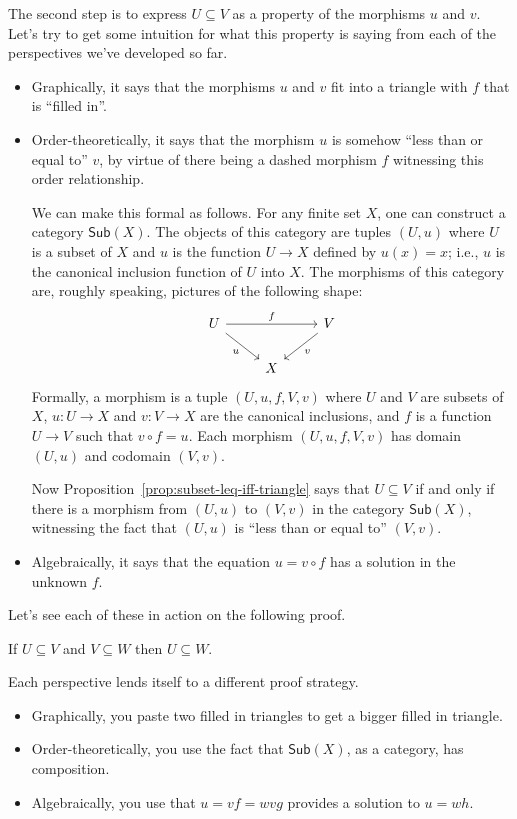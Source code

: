 The second step is to express \(U\subseteq V\)
as a property of the morphisms \(u\) and \(v\).
Let's try to get some intuition for what this property is saying
from each of the perspectives we've developed so far.
\begin{itemize}
\item Graphically, it says that the morphisms \(u\) and \(v\)
  fit into a triangle with \(f\) that is ``filled in''.
\item Order-theoretically, it says that the morphism \(u\) is somehow
  ``less than or equal to'' \(v\), by virtue of there being a dashed morphism
  \(f\) witnessing this order relationship.

  We can make this formal as follows.
  For any finite set \(X\), one can construct a category \(\mathsf{Sub}(X)\).
  The objects of this category are tuples \((U,u)\) where \(U\) is a subset of \(X\)
  and \(u\) is the function \(U \to X\) defined by \(u(x) = x\);
  i.e., \(u\) is the canonical inclusion function of \(U\) into \(X\).
  The morphisms of this category are, roughly speaking,
  pictures of the following shape:
  \[
\begin{tikzcd}
U \arrow[rd, "u"'] \arrow[rr, "f"] &   & V \arrow[ld, "v"] \\
                                   & X &
\end{tikzcd}
  \]
  Formally, a morphism is a tuple \((U,u,f,V,v)\)
  where \(U\) and \(V\) are subsets of \(X\),
  \(u : U \to X\) and \(v : V \to X\) are the canonical inclusions,
  and \(f\) is a function \(U \to V\)
  such that \(v \circ f = u\).
  Each morphism \((U,u,f,V,v)\) has domain \((U,u)\)
  and codomain \((V,v)\).

  Now Proposition~\ref{prop:subset-leq-iff-triangle}
  says that \(U\subseteq V\) if and only if there is a morphism from \((U,u)\)
  to \((V,v)\) in the category \(\mathsf{Sub}(X)\),
  witnessing the fact that \((U,u)\) is ``less than or equal to'' \((V,v)\).

\item Algebraically, it says that the equation \(u = v \circ f\)
  has a solution in the unknown \(f\).
\end{itemize}
Let's see each of these in action on the following proof.
\begin{proposition}
  If \(U\subseteq V\) and \(V \subseteq W\) then \(U\subseteq W\).
\end{proposition}
Each perspective lends itself to a different proof strategy.
\begin{itemize}
\item Graphically, you paste two filled in triangles to get a bigger filled in triangle.
\item Order-theoretically, you use the fact that \(\mathsf{Sub}(X)\), as a category,
  has composition.
\item Algebraically, you use that \(u = vf = wvg\) provides a solution to \(u = wh\).
\end{itemize}


